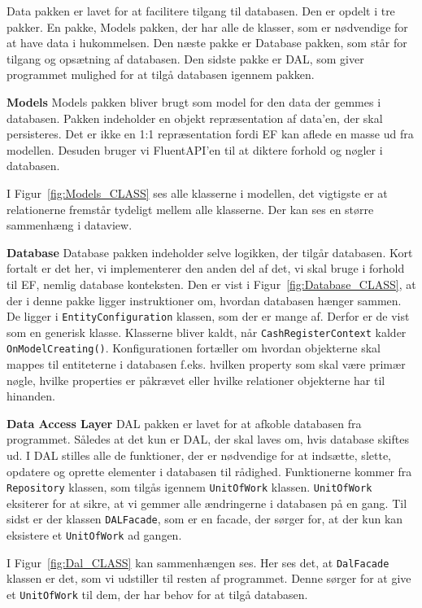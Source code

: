 Data pakken er lavet for at facilitere tilgang til databasen. Den er opdelt i tre pakker. En pakke, Models pakken, der har alle de klasser, som er nødvendige for at have data i hukommelsen. Den næste pakke er Database pakken, som står for tilgang og opsætning af databasen. Den sidste pakke er \gls{DAL}, som giver programmet mulighed for at tilgå databasen igennem pakken.
\newline\newline

\textbf{Models}\newline
Models pakken bliver brugt som model for den data der gemmes i databasen. Pakken indeholder en objekt repræsentation af data'en, der skal persisteres. Det er ikke en 1:1 repræsentation fordi \gls{EF} kan aflede en masse ud fra modellen. Desuden bruger vi \gls{FluentAPI}'en til at diktere forhold og nøgler i databasen.


I Figur~\ref{fig:Models_CLASS} ses alle klasserne i modellen, det vigtigste er at relationerne fremstår tydeligt mellem alle klasserne. Der kan ses en større sammenhæng i dataview.
\newline

\textbf{Database}\newline
Database pakken indeholder selve logikken, der tilgår databasen. Kort fortalt er det her, vi implementerer den anden del af det, vi skal bruge i forhold til \gls{EF}, nemlig database konteksten. 
Den er vist i Figur~\ref{fig:Database_CLASS}, at der i denne pakke ligger instruktioner om, hvordan databasen hænger sammen. De ligger i \texttt{EntityConfiguration} klassen\cite{gh:propertiesfluent}\cite{gh:relationshipfluent}, som der er mange af. Derfor er de vist som en generisk klasse.
Klasserne bliver kaldt, når \texttt{CashRegisterContext} kalder \texttt{OnModelCreating()}. Konfigurationen fortæller om hvordan objekterne skal mappes til entiteterne i databasen f.eks. hvilken property som skal være primær nøgle, hvilke properties er påkrævet eller hvilke relationer objekterne har til hinanden. 

\textbf{Data Access Layer}\newline
\gls{DAL} pakken er lavet for at afkoble databasen fra programmet. 
Således at det kun er \gls{DAL}, der skal laves om, hvis database skiftes ud. 
I \gls{DAL} stilles alle de funktioner, der er nødvendige for at indsætte, slette, opdatere og oprette elementer i databasen til rådighed. 
Funktionerne kommer fra \texttt{Repository} klassen, som tilgås igennem \texttt{UnitOfWork} klassen.
\texttt{UnitOfWork} eksiterer for at sikre, at vi gemmer alle ændringerne i databasen på en gang\cite{gh:uowrepo}.
Til sidst er der klassen \texttt{DALFacade}, som er en facade, der sørger for, at der kun kan eksistere et \texttt{UnitOfWork} ad gangen. 


I Figur~\ref{fig:Dal_CLASS} kan sammenhængen ses. Her ses det, at \texttt{DalFacade} klassen er det, som vi udstiller til resten af programmet. Denne sørger for at give et \texttt{UnitOfWork} til dem, der har behov for at tilgå databasen.